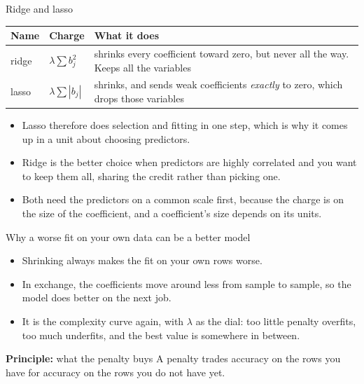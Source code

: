 \documentclass[aspectratio=169]{beamer}
\newenvironment{principle}[1]{\begin{block}{\textbf{Principle:} #1}}{\end{block}}
\begin{document}
\begin{frame}{Ridge and lasso}
\begin{center}\small
\begin{tabular}{L{0.16\textwidth} L{0.26\textwidth} L{0.46\textwidth}}
\toprule
\textbf{Name} & \textbf{Charge} & \textbf{What it does} \\
\midrule
ridge & $\lambda \sum b_j^2$ & shrinks every coefficient toward zero, but never all the way.
Keeps all the variables \\
lasso & $\lambda \sum |b_j|$ & shrinks, and sends weak coefficients \emph{exactly} to zero,
which drops those variables \\
\bottomrule
\end{tabular}
\end{center}
\begin{itemize}\small
  \item Lasso therefore does selection and fitting in one step, which is why it comes up in a
        unit about choosing predictors.
  \item Ridge is the better choice when predictors are highly correlated and you want to keep
        them all, sharing the credit rather than picking one.
  \item Both need the predictors on a common scale first, because the charge is on the size of
        the coefficient, and a coefficient's size depends on its units.
\end{itemize}
\end{frame}

\begin{frame}{Why a worse fit on your own data can be a better model}
\begin{itemize}
  \item Shrinking always makes the fit on your own rows worse.
  \item In exchange, the coefficients move around less from sample to sample, so the model does
        better on the next job.
  \item It is the complexity curve again, with $\lambda$ as the dial: too little penalty
        overfits, too much underfits, and the best value is somewhere in between.
\end{itemize}
\begin{principle}{what the penalty buys}
A penalty trades accuracy on the rows you have for accuracy on the rows you do not have yet.
\end{principle}
\end{frame}
\end{document}
